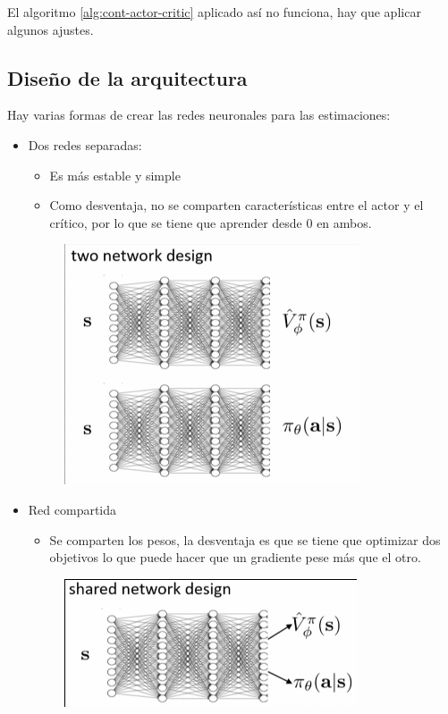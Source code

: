 El algoritmo \ref{alg:cont-actor-critic} aplicado así no funciona, hay que aplicar algunos ajustes.

\subsection{Diseño de la arquitectura}%
\label{sub:diseño_de_la_arquitectura}

Hay varias formas de crear las redes neuronales para las estimaciones:
\begin{itemize}
    \item Dos redes separadas:
        \begin{itemize}
            \item Es más estable y simple
            \item Como desventaja, no se comparten características entre el actor y el crítico,
                por lo que se tiene que aprender desde 0 en ambos.
        \end{itemize}
\begin{figure}[htpb]
	\centering
	\includegraphics[width=0.4\linewidth]{figures/2020-06-14-123008_330x269_scrot.png}
\end{figure}
    \item Red compartida
    \begin{itemize}
        \item Se comparten los pesos, la desventaja es que se tiene que optimizar dos
            objetivos lo que puede hacer que un gradiente pese más que el otro.
    \end{itemize}
\begin{figure}[htpb]
	\centering
	\includegraphics[width=0.4\linewidth]{figures/2020-06-14-123202_327x143_scrot.png}
\end{figure}
\end{itemize}

